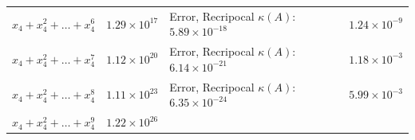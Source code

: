 \documentclass[
]{article}
\begin{document}
\begin{longtable}[]{@{}llll@{}}
\begin{minipage}[t]{0.23\columnwidth}\raggedright
\(x_{4}+x_{4}^{2}+\dots+x_{4}^{6}\)\strut
\end{minipage} & \begin{minipage}[t]{0.15\columnwidth}\raggedright
\(1.29 \times 10^{17}\)\strut
\end{minipage} & \begin{minipage}[t]{0.36\columnwidth}\raggedright
Error, Recripocal \(\kappa(A)\): \(5.89 \times 10^{-18}\)\strut
\end{minipage} & \begin{minipage}[t]{0.15\columnwidth}\raggedright
\(1.24 \times 10^{-9}\)\strut
\end{minipage}\tabularnewline
\begin{minipage}[t]{0.23\columnwidth}\raggedright
\(x_{4}+x_{4}^{2}+\dots+x_{4}^{7}\)\strut
\end{minipage} & \begin{minipage}[t]{0.15\columnwidth}\raggedright
\(1.12 \times 10^{20}\)\strut
\end{minipage} & \begin{minipage}[t]{0.36\columnwidth}\raggedright
Error, Recripocal \(\kappa(A)\): \(6.14 \times 10^{-21}\)\strut
\end{minipage} & \begin{minipage}[t]{0.15\columnwidth}\raggedright
\(1.18 \times 10^{-3}\)\strut
\end{minipage}\tabularnewline
\begin{minipage}[t]{0.23\columnwidth}\raggedright
\(x_{4}+x_{4}^{2}+\dots+x_{4}^{8}\)\strut
\end{minipage} & \begin{minipage}[t]{0.15\columnwidth}\raggedright
\(1.11 \times 10^{23}\)\strut
\end{minipage} & \begin{minipage}[t]{0.36\columnwidth}\raggedright
Error, Recripocal \(\kappa(A)\): \(6.35 \times 10^{-24}\)\strut
\end{minipage} & \begin{minipage}[t]{0.15\columnwidth}\raggedright
\(5.99 \times 10^{-3}\)\strut
\end{minipage}\tabularnewline
\begin{minipage}[t]{0.23\columnwidth}\raggedright
\(x_{4}+x_{4}^{2}+\dots+x_{4}^{9}\)\strut
\end{minipage} & \begin{minipage}[t]{0.15\columnwidth}\raggedright
\(1.22 \times 10^{26}\)\strut

\end{minipage}
\end{longtable}
\end{document}
